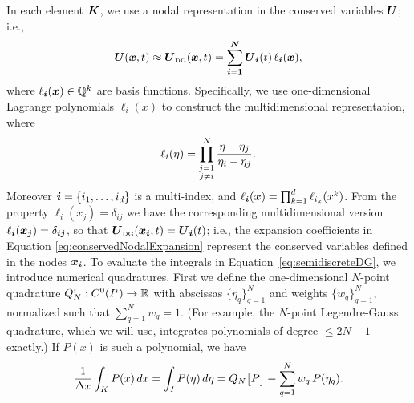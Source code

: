 \documentclass[10pt,preprint]{aastex}
\begin{document}
In each element $\boldsymbol{K}$, we use a nodal representation in the conserved variables $\boldsymbol{U}$; i.e.,
\begin{equation}
  \boldsymbol{U}(\boldsymbol{x},t)\approx
  \boldsymbol{U}_{\mbox{\tiny DG}}(\boldsymbol{x},t)=\sum_{\boldsymbol{i}=\boldsymbol{1}}^{\boldsymbol{N}}\boldsymbol{U}_{\boldsymbol{i}}(t)\,\ell_{\boldsymbol{i}}(\boldsymbol{x}),
  \label{eq:conservedNodalExpansion}
\end{equation}
where $\ell_{\boldsymbol{i}}(\boldsymbol{x})\in\mathbb{Q}^{k}$ are basis functions.  
Specifically, we use one-dimensional Lagrange polynomials $\ell_{i}(x)$ to construct the multidimensional representation, where
\begin{equation}
  \ell_{i}(\eta)=
  \prod_{\substack{j=1\\j\ne i}}^{N}\frac{\eta-\eta_{j}}{\eta_{i}-\eta_{j}}.  
\end{equation}
Moreover $\boldsymbol{i}=\{i_{1},\ldots,i_{d}\}$ is a multi-index, and $\ell_{\boldsymbol{i}}(\boldsymbol{x})=\prod_{k=1}^{d}\ell_{i_{k}}(x^{k})$.  
From the property $\ell_{i}(x_{j})=\delta_{ij}$ we have the corresponding multidimensional version $\ell_{\boldsymbol{i}}(\boldsymbol{x}_{\boldsymbol{j}})=\delta_{\boldsymbol{i}\boldsymbol{j}}$, so that $\boldsymbol{U}_{\mbox{\tiny DG}}(\boldsymbol{x}_{\boldsymbol{i}},t)=\boldsymbol{U}_{\boldsymbol{i}}(t)$; i.e., the expansion coefficients in Equation \eqref{eq:conservedNodalExpansion} represent the conserved variables defined in the nodes $\boldsymbol{x}_{\boldsymbol{i}}$.  
To evaluate the integrals in Equation~\eqref{eq:semidiscreteDG}, we introduce numerical quadratures.  
First we define the one-dimensional $N$-point quadrature $Q_{N}^{i}:C^{0}(I^{i})\to\mathbb{R}$ with abscissas $\{\eta_{q}\}_{q=1}^{N}$ and weights $\{w_{q}\}_{q=1}^{N}$, normalized such that $\sum_{q=1}^{N}w_{q}=1$.  
(For example, the $N$-point Legendre-Gauss quadrature, which we will use, integrates polynomials of degree $\le 2N-1$ exactly.)
If $P(x)$ is such a polynomial, we have
\begin{equation}
  \frac{1}{\Delta x}\int_{K}P(x)\,dx=\int_{I}P(\eta)\,d\eta=Q_{N}\big[P\big]\equiv\sum_{q=1}^{N}w_{q}\,P(\eta_{q}).  
\end{equation}
\end{document}
